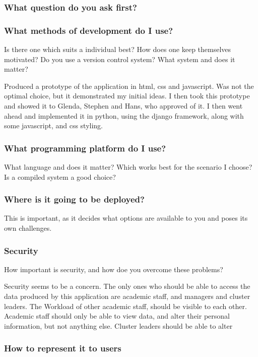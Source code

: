 \documentclass[11pt]{article}
\begin{document}
\subsubsection{What question do you ask first?}
\label{sec-2_2_1}
\subsubsection{What methods of development do I use?}
\label{sec-2_2_2}

Is there one which suits a individual best?  How does one keep
themselves motivated?  Do you use a version control system?  What
system and does it matter?


Produced a prototype of the application in html, css and javascript.
Was not the optimal choice, but it demonstrated my initial ideas.  I
then took this prototype and showed it to Glenda, Stephen and Hans,
who approved of it.  I then went ahead and implemented it in python,
using the django framework, along with some javascript, and css styling.
\subsubsection{What programming platform do I use?}
\label{sec-2_2_3}

What language and does it matter?  Which works best for the scenario I
choose?  Is a compiled system a good choice?
\subsubsection{Where is it going to be deployed?}
\label{sec-2_2_4}

This is important, as it decides what options are available to you and
poses its own challenges.
\subsubsection{Security}
\label{sec-2_2_5}

How important is security, and how doe you overcome these problems?

Security seems to be a concern.  The only ones who should be able to
access the data produced by this application are academic staff, and managers
and cluster leaders. The Workload of other academic staff, should be
visible to each other.  Academic staff should only be able to view
data, and alter their personal information, but not anything else.
Cluster leaders should be able to alter 
\subsubsection{How to represent it to users}
\label{sec-2_2_6}
\end{document}
